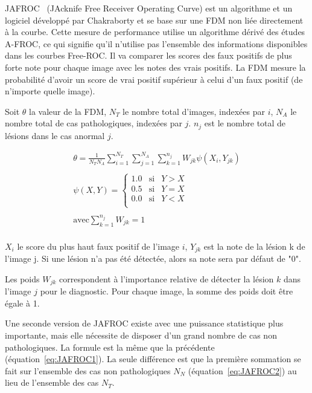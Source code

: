 JAFROC~\cite{chakraborty2004observer} (JAcknife Free Receiver Operating Curve) est un algorithme et un logiciel développé par Chakraborty et se base sur une FDM non liée directement à la courbe. Cette mesure de performance utilise un algorithme dérivé des études A-FROC, ce qui signifie qu'il n'utilise pas l'ensemble des informations disponibles dans les courbes Free-ROC. Il va comparer les scores des faux positifs de plus forte note pour chaque image avec les notes des vrais positifs. La FDM mesure la probabilité d'avoir un score de vrai positif supérieur à celui d'un faux positif (de n'importe quelle image).

Soit $\theta$ la valeur de la FDM, $N_T$ le nombre total d'images, indexées par $i$, $N_A$ le nombre total de cas pathologiques, indexées par $j$. $n_j$ est le nombre total de lésions dans le cas anormal $j$.

\begin{equation}
\label{eq:JAFROC1}
\begin{array}{l}
	\displaystyle \theta=\frac{1}{N_T N_A} \sum_{i=1}^{N_T} \sum_{j=1}^{N_A} \sum_{k=1}^{n_j} W_{jk} \psi(X_i, Y_{jk}) \\
	\\
	\displaystyle \psi(X,Y) = \left\{
		\begin{array}{lll}
			1.0 & \mbox{si} & Y > X \\
			0.5 & \mbox{si} & Y = X    \\
			0.0 & \mbox{si} & Y < X    \\
		\end{array}
	\right. \\
	\\
	\displaystyle \mbox{avec} \sum_{k=1}^{n_j} W_{jk} = 1 \\
\end{array}
\end{equation}

$X_i$ le score du plus haut faux positif de l'image $i$, $Y_{jk}$ est la note de la lésion k de l'image j. Si une lésion n'a pas été détectée, alors sa note sera par défaut de "0".

Les poids $W_{jk}$ correspondent à l'importance relative de détecter la lésion $k$ dans l'image $j$ pour le diagnostic. Pour chaque image, la somme des poids doit être égale à 1.

Une seconde version de JAFROC existe avec une puissance statistique plus importante, mais elle nécessite de disposer d'un grand nombre de cas non pathologiques. La formule est la même que la précédente (équation~\ref{eq:JAFROC1}). La seule différence est que la première sommation se fait sur l'ensemble des cas non pathologiques $N_N$ (équation~\ref{eq:JAFROC2}) au lieu de l'ensemble des cas $N_T$.

